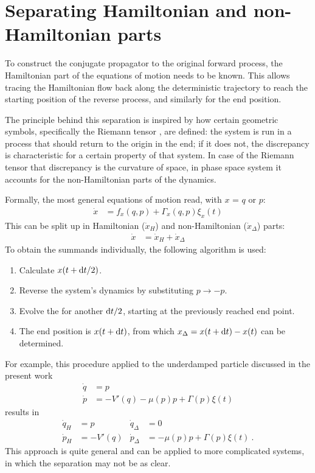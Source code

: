 \section{Separating Hamiltonian and non-Hamiltonian parts}


To construct the conjugate propagator to the original forward process, the Hamiltonian part of the equations of motion needs to be known. This allows tracing the Hamiltonian flow back along the deterministic trajectory to reach the starting position of the reverse process, and similarly for the end position.

The principle behind this separation is inspired by how certain geometric symbols, specifically the Riemann tensor , are defined: the system is run in a process that should return to the origin in the end; if it does not, the discrepancy is characteristic for a certain property of that system. In case of the Riemann tensor that discrepancy is the curvature of space, in phase space system it accounts for the non-Hamiltonian parts of the dynamics.

Formally, the most general equations of motion read, with \(x\) = \(q\) or \(p\):
%
\begin{align}
	\dot x &= f_x(q,p) + \Gamma_x(q,p)\xi_x(t)
\end{align}
%
This can be split up in Hamiltonian (\(\dot x_H\)) and non-Hamiltonian (\(\dot x_\Delta\)) parts:
%
\begin{align}
	\dot x &= \dot x_H + \dot x_\Delta
\end{align}
%
To obtain the summands individually, the following algorithm is used:
%
\begin{enumerate}
	\item Calculate \(x(t+\mathrm{d} t/2) \).
	\item Reverse the system's dynamics by substituting \(p \to -p\).
	\item Evolve the for another \(\mathrm{d} t/2\), starting at the previously reached end point.
	\item The end position is \(x(t+\mathrm{d} t)\), from which \(x_\Delta = x(t+\mathrm{d} t) - x(t)\) can be determined.
\end{enumerate}
%
For example, this procedure applied to the underdamped particle discussed in the present work
%
\begin{align*}
	\dot q &= p \\
	\dot p &= -V'(q) - \mu(p)p + \Gamma(p)\xi(t)
\end{align*}
results in
\begin{align*}
	\dot q_H &= p  &  \dot q_\Delta &= 0 \\
	\dot p_H &= -V'(q)  &  \dot p_\Delta &= - \mu(p)p + \Gamma(p)\xi(t) ~.
\end{align*}
This approach is quite general and can be applied to more complicated systems, in which the separation may not be as clear.

